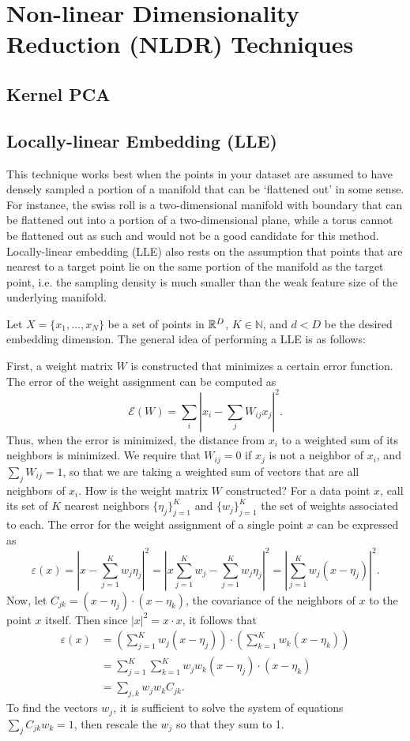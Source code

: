 \documentclass{gtpart}
\theoremstyle{definition}
\begin{document}
\section{Non-linear Dimensionality Reduction (NLDR) Techniques}

\subsection{Kernel PCA}

\subsection{Locally-linear Embedding (LLE)}

This technique works best when the points in your dataset are assumed to have densely sampled a portion of a manifold that can be `flattened out' in some sense. For instance, the swiss roll is a two-dimensional manifold with boundary that can be flattened out into a portion of a two-dimensional plane, while a torus cannot be flattened out as such and would not be a good candidate for this method. Locally-linear embedding (LLE) also rests on the assumption that points that are nearest to a target point lie on the same portion of the manifold as the target point, i.e. the sampling density is much smaller than the weak feature size of the underlying manifold. 

Let $X = \{x_1, ..., x_N\}$ be a set of points in $\mathbb{R}^D$, $K \in \mathbb{N}$, and $d < D$ be the desired embedding dimension. The general idea of performing a LLE is as follows:

First, a weight matrix $W$ is constructed that minimizes a certain error function. The error of the weight assignment can be computed as $$\mathscr{E}(W) = \sum_i \left| x_i - \sum_j W_{ij} x_j \right|^2.$$ Thus, when the error is minimized, the distance from $x_i$ to a weighted sum of its neighbors is minimized. We require that $W_{ij} = 0$ if $x_j$ is not a neighbor of $x_i$, and $\sum_j W_{ij} = 1$, so that we are taking a weighted sum of vectors that are all neighbors of $x_i$. How is the weight matrix $W$ constructed? For a data point $x$, call its set of $K$ nearest neighbors $\{ \eta_j\}_{j=1}^K$ and $\{w_j\}_{j=1}^K$ the set of weights associated to each. The error for the weight assignment of a single point $x$ can be expressed as $$\varepsilon(x) = \left| x - \sum_{j=1}^K w_j \eta_j \right|^2 = \left| x\sum_{j=1}^K w_j - \sum_{j=1}^K w_j \eta_j \right|^2 = \left| \sum_{j=1}^K w_j(x - \eta_j)\right|^2.$$ Now, let $C_{jk} = (x - \eta_j) \cdot (x - \eta_k)$, the covariance of the neighbors of $x$ to the point $x$ itself. Then since $|x|^2 =  x \cdot x $, it follows that 
\begin{align*}
\varepsilon(x) &= \left (  \sum_{j=1}^K w_j(x - \eta_j) \right) \cdot \left( \sum_{k=1}^K w_k(x - \eta_k) \right ) \\
&= \sum_{j=1}^K \sum_{k=1}^K w_j w_k  (x - \eta_j) \cdot (x - \eta_k) \\
&= \sum_{j,k} w_j w_k C_{jk}.
\end{align*}
To find the vectors $w_j$, it is sufficient to solve the system of equations $\sum_j C_{jk}w_k = 1$, then rescale the $w_j$ so that they sum to 1. 
\end{document}
